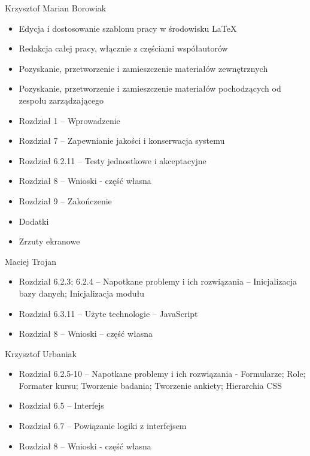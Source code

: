 \begin{description}
\item Krzysztof Marian Borowiak

\begin{itemize}
\item Edycja i dostosowanie szablonu pracy w środowisku \LaTeX
\item Redakcja całej pracy, włącznie z częściami współautorów
\item Pozyskanie, przetworzenie i zamieszczenie materiałów zewnętrznych
\item Pozyskanie, przetworzenie i zamieszczenie materiałów pochodzących od zespołu zarządzającego
\item Rozdział 1 -- Wprowadzenie
\item Rozdział 7 -- Zapewnianie jakości i konserwacja systemu
\item Rozdział 6.2.11 -- Testy jednostkowe i akceptacyjne
\item Rozdział 8 -- Wnioski - część własna
\item Rozdział 9 -- Zakończenie
\item Dodatki
\item Zrzuty ekranowe
\end{itemize}
\noindent

\item Maciej Trojan

\begin{itemize}
\item Rozdział 6.2.3; 6.2.4 -- Napotkane problemy i ich rozwiązania -- Inicjalizacja bazy danych; Inicjalizacja modułu
\item Rozdział 6.3.11 -- Użyte technologie -- JavaScript
\item Rozdział 8 -- Wnioski -- część własna
\end{itemize}
\noindent

\item Krzysztof Urbaniak

\begin{itemize}
\item Rozdział 6.2.5-10 -- Napotkane problemy i ich rozwiązania - Formularze; Role; Formater kursu; Tworzenie badania; Tworzenie ankiety; Hierarchia CSS
\item Rozdział 6.5 -- Interfejs
\item Rozdział 6.7 -- Powiązanie logiki z interfejsem
\item Rozdział 8 -- Wnioski - część własna
\end{itemize}
\noindent


\end{description}
